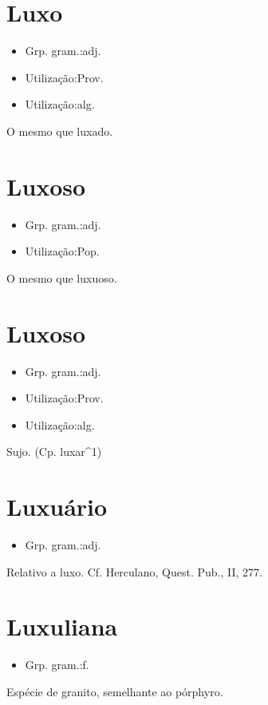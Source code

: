 \section{Luxo}
\begin{itemize}
\item {Grp. gram.:adj.}
\end{itemize}
\begin{itemize}
\item {Utilização:Prov.}
\end{itemize}
\begin{itemize}
\item {Utilização:alg.}
\end{itemize}
O mesmo que \textunderscore luxado\textunderscore .
\section{Luxoso}
\begin{itemize}
\item {Grp. gram.:adj.}
\end{itemize}
\begin{itemize}
\item {Utilização:Pop.}
\end{itemize}
O mesmo que \textunderscore luxuoso\textunderscore .
\section{Luxoso}
\begin{itemize}
\item {Grp. gram.:adj.}
\end{itemize}
\begin{itemize}
\item {Utilização:Prov.}
\end{itemize}
\begin{itemize}
\item {Utilização:alg.}
\end{itemize}
Sujo.
(Cp. \textunderscore luxar\textunderscore ^1)
\section{Luxuário}
\begin{itemize}
\item {Grp. gram.:adj.}
\end{itemize}
Relativo a luxo. Cf. Herculano, \textunderscore Quest. Pub.\textunderscore , II, 277.
\section{Luxuliana}
\begin{itemize}
\item {Grp. gram.:f.}
\end{itemize}
Espécie de granito, semelhante ao pórphyro.
